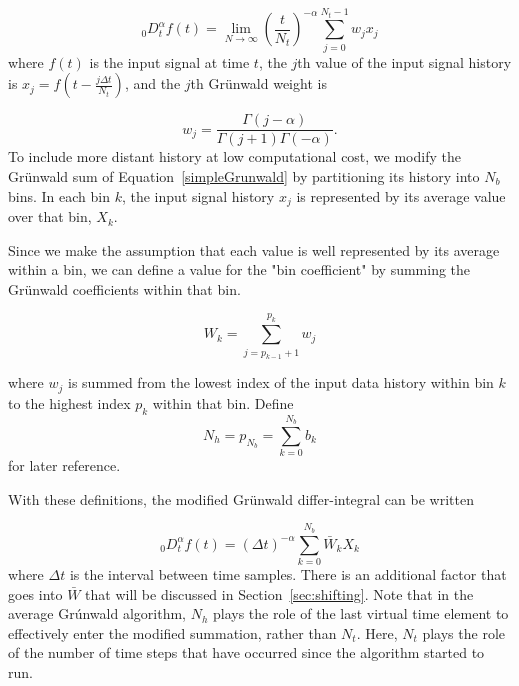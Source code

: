 \begin{equation}
_0D^\alpha_tf(t) = \displaystyle \lim_{N\to\infty} \left(\frac{t}{N_t}\right)^{-\alpha}
\displaystyle\sum\limits_{j=0}^{N_t-1} w_{j}x_j
\label{simpleGrunwald}
\end{equation}
where $f(t)$ is the input signal at time $t$, the $j$th value of the
input signal history is $x_j=f\left(t-\frac{j\Delta t}{N_t}\right)$, and the
$j$th Gr{\"u}nwald weight is

\begin{equation}
w_{j} = \frac{\Gamma(j-\alpha)}{\Gamma(j+1)\Gamma(-\alpha)}.
\label{wj}
\end{equation}
To include more distant history at low computational cost, we modify
the Gr{\"u}nwald sum of Equation~\ref{simpleGrunwald} by partitioning its
history into $N_b$ bins. In each bin $k$, the input signal history
$x_j$ is represented by its average value over that bin, $X_k$.

Since we make the assumption that each value is well represented by
its average within a bin, we can define a value for the "bin
coefficient" by summing the Gr{\"u}nwald coefficients within that bin.

\begin{equation}
W_k = \displaystyle\sum\limits_{j=p_{k-1}+1}^{p_k} w_j
\label{eqn:sumWk}
\end{equation}

\noindent where $w_j$ is summed from the lowest index of the input data history within bin $k$ to the highest index $p_k$ within that bin. Define
\begin{equation}
N_h=p_{N_b}=\displaystyle\sum_{k=0}^{N_b}b_k
\label{eqn:Nh}
\end{equation}
for later reference. 

With these definitions, the modified Gr{\"u}nwald differ-integral can be written

\begin{equation}
_0D^\alpha_t f(t) = \displaystyle(\Delta t)^{-\alpha}\sum\limits_{k=0}^{N_b}\bar{W}_kX_k
\label{avgSimpleGrunwald}
\end{equation}
where $\Delta t$ is the interval between time samples. There is an additional factor that goes into $\bar{W}$ that will be discussed in Section~\ref{sec:shifting}. Note that in the average Gr{\'u}nwald algorithm, $N_h$ plays the role of the last virtual time element to effectively enter the modified summation, rather than $N_t$. Here, $N_t$ plays the role of the number of time steps that have occurred since the algorithm started to run. 



